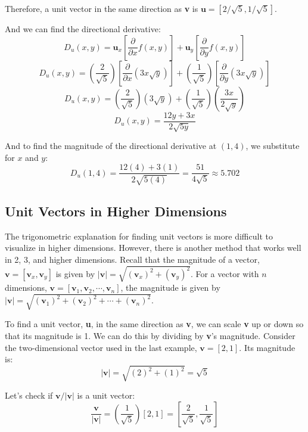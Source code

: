 Therefore, a unit vector in the same direction as \textbf{v} is $\textbf{u} = 
\left[ 2/\sqrt{5}, 1/\sqrt{5} \right]$. 

And we can find the directional derivative:
$$D_u(x, y) = \textbf{u}_x \left[ \frac{\partial}{\partial x} f(x, y) \right] 
+ \textbf{u}_y \left[ \frac{\partial}{\partial y} f(x, y) \right]$$
$$D_u(x, y) = \left( \frac{2}{\sqrt{5}} \right) \left[ \frac{\partial}{
\partial x} \left( 3x\sqrt{y} \right) \right] + \left( \frac{1}{\sqrt{5}} 
\right) \left[ \frac{\partial}{\partial y} \left( 3x\sqrt{y} \right) \right]$$
$$D_u(x, y) = \left( \frac{2}{\sqrt{5}} \right) \left( 3\sqrt{y} \right) + 
\left( \frac{1}{\sqrt{5}} \right) \left( \frac{3x}{2\sqrt{y}} \right)$$
$$D_u(x, y) = \frac{12y + 3x}{2\sqrt{5y}}$$

And to find the magnitude of the directional derivative at $(1, 4)$, we 
substitute for $x$ and $y$:
$$D_u(1, 4) = \frac{12(4) + 3(1)}{2\sqrt{5(4)}} = \frac{51}{4\sqrt{5}} 
\approx 5.702$$

\subsection{Unit Vectors in Higher Dimensions}
The trigonometric explanation for finding unit vectors is more difficult to visualize in higher dimensions. However, there is another method that works well in 2, 3, and higher dimensions. Recall that the magnitude of a vector, $\textbf{v} = \left[ \textbf{v}_x, \textbf{v}_y \right]$ is given by $| \textbf{v} | = \sqrt{\left( \textbf{v}_x \right)^2 + \left( \textbf{v}_y \right)^2}$. For a vector with $n$ dimensions, $\textbf{v} = \left[ \textbf{v}_1, \textbf{v}_2, \cdots , \textbf{v}_n \right]$, the magnitude is given by $| \textbf{v} | = \sqrt{ \left( \textbf{v}_1 \right)^2 + \left( \textbf{v}_2 \right)^2 + \cdots + \left( \textbf{v}_n \right)^2}$. 

To find a unit vector, \textbf{u}, in the same direction as \textbf{v}, we can scale \textbf{v} up or down so that its magnitude is 1. We can do this by dividing by \textbf{v}'s magnitude. Consider the two-dimensional vector used in the last example, $\textbf{v} = \left[ 2, 1 \right]$. Its magnitude is:
$$| \textbf{v} | = \sqrt{\left( 2 \right)^2 + \left( 1 \right)^2} = \sqrt{5}$$

Let's check if $\textbf{v} / | \textbf{v} |$ is a unit vector:
$$ \frac{\textbf{v}}{|\textbf{v}|} = \left( \frac{1}{\sqrt{5}} \right) \left[ 2, 1 \right] = \left[ \frac{2}{\sqrt{5}}, \frac{1}{\sqrt{5}} \right]$$

